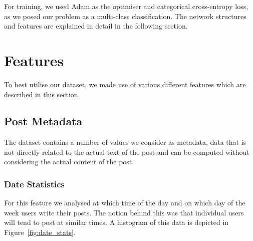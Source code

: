 \documentclass[acmsmall]{acmart}
\begin{document}
For training, we used Adam \cite{adam} as the optimiser and categorical cross-entropy loss, as we posed our problem as a multi-class classification. The network structures and features are explained in detail in the following section. 

\section{Features}
To best utilise our dataset, we made use of various different features which are described in this section. 

\subsection{Post Metadata}
The dataset contains a number of values we consider as metadata, data that is not directly related to the actual text of the post and can be computed without considering the actual content of the post. 

\subsubsection{Date Statistics}
For this feature we analysed at which time of the day and on which day of the week users write their posts. 
The notion behind this was that individual users will tend to post at similar times.
A histogram of this data is depicted in Figure~\ref{fig:date_stats}.
\end{document}

